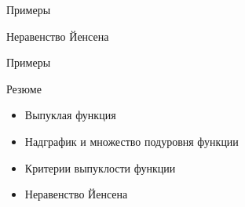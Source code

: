 \documentclass[12pt,russian]{beamer}
\begin{document}
\begin{frame}{Примеры}

\end{frame}

\begin{frame}{Неравенство Йенсена} 

\end{frame}

\begin{frame}{Примеры}

\end{frame}

\begin{frame}{Резюме}
\begin{itemize}
\item Выпуклая функция
\item Надграфик и множество подуровня функции
\item Критерии выпуклости функции
\item Неравенство Йенсена
\end{itemize}
\end{frame}
\end{document}

